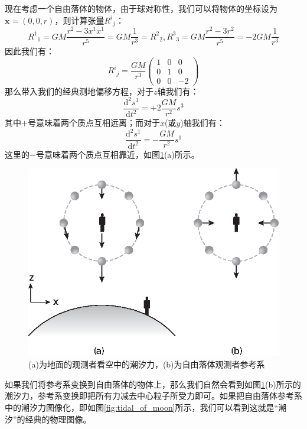 \documentclass[hyperref, UTF8, a4paper]{ctexart}
\begin{document}
现在考虑一个自由落体的物体，由于球对称性，我们可以将物体的坐标设为$\boldsymbol{x} =(0,0,r)$，则计算张量$R^{i}{}_{j}$：
\begin{equation*}
	R^{1}{}_{1} =GM\frac{r^{2} -3x^{1} x^{1}}{r^{5}} =GM\frac{1}{r^{3}} =R^{2}{}_{2} ,R^{3}{}_{3} =GM\frac{r^{2} -3r^{2}}{r^{5}} =-2GM\frac{1}{r^{3}}
\end{equation*}
因此我们有：
\begin{equation*}
	R^{i}{}_{j} =\frac{GM}{r^{3}}\begin{pmatrix}
		1 & 0 & 0\\
		0 & 1 & 0\\
		0 & 0 & -2
	\end{pmatrix}
\end{equation*}
那么带入我们的经典测地偏移方程，对于$z$轴我们有：
\begin{equation*}
	\frac{\mathrm{d}^{2} s^{3}}{\mathrm{d} t^{2}} =+2\frac{GM}{r^{2}} s^{3}
\end{equation*}
其中$+$号意味着两个质点互相远离；而对于$x$(或$y$)轴我们有：
\begin{equation*}
	\frac{\mathrm{d}^{2} s^{1}}{\mathrm{d} t^{2}} =-\frac{GM}{r^{2}} s^{1}
\end{equation*}
这里的$-$号意味着两个质点互相靠近，如图\ref{fig:tidal_of_falling_obj}(a)所示。
\begin{figure}
	\centering
	\includegraphics{tidal_of_falling_obj.eps}
	\caption{(a)为地面的观测者看空中的潮汐力，(b)为自由落体观测者参考系}
	\label{fig:tidal_of_falling_obj}
\end{figure}
如果我们将参考系变换到自由落体的物体上，那么我们自然会看到如图\ref{fig:tidal_of_falling_obj}(b)所示的潮汐力，参考系变换即把所有力减去中心粒子所受力即可。如果把自由落体参考系中的潮汐力图像化，即如图\ref{fig:tidal_of_moon}所示，我们可以看到这就是“潮汐”的经典的物理图像。
\end{document}
